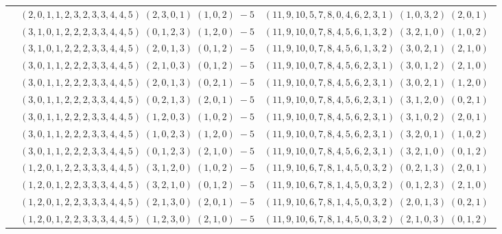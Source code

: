 \documentclass[11pt]{article}
\begin{document}
\begin{longtable}[l]{|c|c|c|}
 \cline{2-3} 
 & $(2 ,0 ,1 ,1 ,2 ,3 ,2 ,3 ,3 ,4 ,4 ,5) \;(2 ,3 ,0 ,1) \;(1 ,0 ,2) \;-5$ & $(11 ,9 ,10 ,5 ,7 ,8 ,0 ,4 ,6 ,2 ,3 ,1) \;(1 ,0 ,3 ,2) \;(2 ,0 ,1) \;$\\ 
 \cline{2-3} 
 & $(3 ,1 ,0 ,1 ,2 ,2 ,2 ,3 ,3 ,4 ,4 ,5) \;(0 ,1 ,2 ,3) \;(1 ,2 ,0) \;-5$ & $(11 ,9 ,10 ,0 ,7 ,8 ,4 ,5 ,6 ,1 ,3 ,2) \;(3 ,2 ,1 ,0) \;(1 ,0 ,2) \;$\\ 
 \cline{2-3} 
 & $(3 ,1 ,0 ,1 ,2 ,2 ,2 ,3 ,3 ,4 ,4 ,5) \;(2 ,0 ,1 ,3) \;(0 ,1 ,2) \;-5$ & $(11 ,9 ,10 ,0 ,7 ,8 ,4 ,5 ,6 ,1 ,3 ,2) \;(3 ,0 ,2 ,1) \;(2 ,1 ,0) \;$\\ 
 \cline{2-3} 
 & $(3 ,0 ,1 ,1 ,2 ,2 ,2 ,3 ,3 ,4 ,4 ,5) \;(2 ,1 ,0 ,3) \;(0 ,1 ,2) \;-5$ & $(11 ,9 ,10 ,0 ,7 ,8 ,4 ,5 ,6 ,2 ,3 ,1) \;(3 ,0 ,1 ,2) \;(2 ,1 ,0) \;$\\ 
 \cline{2-3} 
 & $(3 ,0 ,1 ,1 ,2 ,2 ,2 ,3 ,3 ,4 ,4 ,5) \;(2 ,0 ,1 ,3) \;(0 ,2 ,1) \;-5$ & $(11 ,9 ,10 ,0 ,7 ,8 ,4 ,5 ,6 ,2 ,3 ,1) \;(3 ,0 ,2 ,1) \;(1 ,2 ,0) \;$\\ 
 \cline{2-3} 
 & $(3 ,0 ,1 ,1 ,2 ,2 ,2 ,3 ,3 ,4 ,4 ,5) \;(0 ,2 ,1 ,3) \;(2 ,0 ,1) \;-5$ & $(11 ,9 ,10 ,0 ,7 ,8 ,4 ,5 ,6 ,2 ,3 ,1) \;(3 ,1 ,2 ,0) \;(0 ,2 ,1) \;$\\ 
 \cline{2-3} 
 & $(3 ,0 ,1 ,1 ,2 ,2 ,2 ,3 ,3 ,4 ,4 ,5) \;(1 ,2 ,0 ,3) \;(1 ,0 ,2) \;-5$ & $(11 ,9 ,10 ,0 ,7 ,8 ,4 ,5 ,6 ,2 ,3 ,1) \;(3 ,1 ,0 ,2) \;(2 ,0 ,1) \;$\\ 
 \cline{2-3} 
 & $(3 ,0 ,1 ,1 ,2 ,2 ,2 ,3 ,3 ,4 ,4 ,5) \;(1 ,0 ,2 ,3) \;(1 ,2 ,0) \;-5$ & $(11 ,9 ,10 ,0 ,7 ,8 ,4 ,5 ,6 ,2 ,3 ,1) \;(3 ,2 ,0 ,1) \;(1 ,0 ,2) \;$\\ 
 \cline{2-3} 
 & $(3 ,0 ,1 ,1 ,2 ,2 ,2 ,3 ,3 ,4 ,4 ,5) \;(0 ,1 ,2 ,3) \;(2 ,1 ,0) \;-5$ & $(11 ,9 ,10 ,0 ,7 ,8 ,4 ,5 ,6 ,2 ,3 ,1) \;(3 ,2 ,1 ,0) \;(0 ,1 ,2) \;$\\ 
 \cline{2-3} 
 & $(1 ,2 ,0 ,1 ,2 ,2 ,3 ,3 ,3 ,4 ,4 ,5) \;(3 ,1 ,2 ,0) \;(1 ,0 ,2) \;-5$ & $(11 ,9 ,10 ,6 ,7 ,8 ,1 ,4 ,5 ,0 ,3 ,2) \;(0 ,2 ,1 ,3) \;(2 ,0 ,1) \;$\\ 
 \cline{2-3} 
 & $(1 ,2 ,0 ,1 ,2 ,2 ,3 ,3 ,3 ,4 ,4 ,5) \;(3 ,2 ,1 ,0) \;(0 ,1 ,2) \;-5$ & $(11 ,9 ,10 ,6 ,7 ,8 ,1 ,4 ,5 ,0 ,3 ,2) \;(0 ,1 ,2 ,3) \;(2 ,1 ,0) \;$\\ 
 \cline{2-3} 
 & $(1 ,2 ,0 ,1 ,2 ,2 ,3 ,3 ,3 ,4 ,4 ,5) \;(2 ,1 ,3 ,0) \;(2 ,0 ,1) \;-5$ & $(11 ,9 ,10 ,6 ,7 ,8 ,1 ,4 ,5 ,0 ,3 ,2) \;(2 ,0 ,1 ,3) \;(0 ,2 ,1) \;$\\ 
 \cline{2-3} 
 & $(1 ,2 ,0 ,1 ,2 ,2 ,3 ,3 ,3 ,4 ,4 ,5) \;(1 ,2 ,3 ,0) \;(2 ,1 ,0) \;-5$ & $(11 ,9 ,10 ,6 ,7 ,8 ,1 ,4 ,5 ,0 ,3 ,2) \;(2 ,1 ,0 ,3) \;(0 ,1 ,2) \;$\\ 

\end{longtable}
\end{document}
